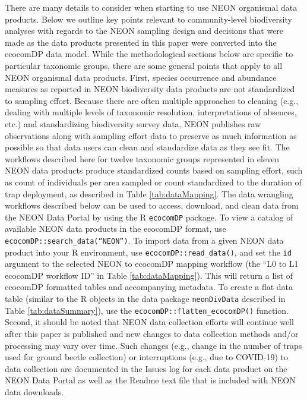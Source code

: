 \documentclass[
  12pt,
]{article}
\begin{document}
There are many details to consider when starting to use NEON organismal data products. Below we outline key points relevant to community-level biodiversity analyses with regards to the NEON sampling design and decisions that were made as the data products presented in this paper were converted into the ecocomDP data model. While the methodological sections below are specific to particular taxonomic groups, there are some general points that apply to all NEON organismal data products. First, species occurrence and abundance measures as reported in NEON biodiversity data products are not standardized to sampling effort. Because there are often multiple approaches to cleaning (e.g., dealing with multiple levels of taxonomic resolution, interpretations of absences, etc.) and standardizing biodiversity survey data, NEON publishes raw observations along with sampling effort data to preserve as much information as possible so that data users can clean and standardize data as they see fit. The workflows described here for twelve taxonomic groups represented in eleven NEON data products produce standardized counts based on sampling effort, such as count of individuals per area sampled or count standardized to the duration of trap deployment, as described in Table \ref{tab:dataMapping}. The data wrangling workflows described below can be used to access, download, and clean data from the NEON Data Portal by using the R \texttt{ecocomDP} package. To view a catalog of available NEON data products in the ecocomDP format, use \texttt{ecocomDP::search\_data(“NEON”)}. To import data from a given NEON data product into your R environment, use \texttt{ecocomDP::read\_data()}, and set the \texttt{id} argument to the selected NEON to ecocomDP mapping workflow (the ``L0 to L1 ecocomDP workflow ID'' in Table \ref{tab:dataMapping}). This will return a list of ecocomDP formatted tables and accompanying metadata. To create a flat data table (similar to the R objects in the data package \texttt{neonDivData} described in Table \ref{tab:dataSummary}), use the \texttt{ecocomDP::flatten\_ecocomDP()} function. Second, it should be noted that NEON data collection efforts will continue well after this paper is published and new changes to data collection methods and/or processing may vary over time. Such changes (e.g., change in the number of traps used for ground beetle collection) or interruptions (e.g., due to COVID-19) to data collection are documented in the Issues log for each data product on the NEON Data Portal as well as the Readme text file that is included with NEON data downloads.
\end{document}
